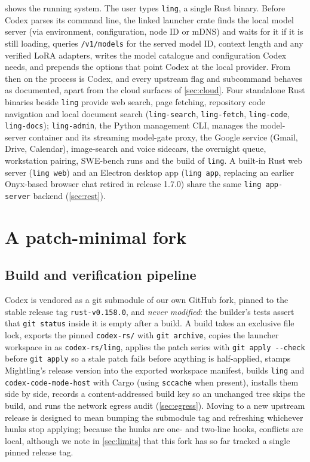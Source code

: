 \documentclass[11pt]{article}
\newcommand{\code}[1]{\texttt{#1}}
\begin{document}
 shows the running system. The user types \code{ling}, a single Rust binary.
Before Codex parses its command line, the linked launcher crate finds the local model server (via
environment, configuration, node ID or mDNS) and waits for it if it is still loading, queries
\code{/v1/models} for the served model ID, context length and any verified LoRA adapters, writes
the model catalogue and configuration Codex needs, and prepends the options that point Codex at the
local provider. From then on the process is Codex, and every upstream flag and subcommand behaves
as documented, apart from the cloud surfaces of \cref{sec:cloud}. Four standalone Rust binaries
beside \code{ling} provide web search, page fetching, repository code navigation and local document
search (\code{ling-search}, \code{ling-fetch}, \code{ling-code}, \code{ling-docs});
\code{ling-admin}, the Python management CLI, manages the model-server container and its streaming
model-gate proxy, the Google service (Gmail, Drive, Calendar), image-search and voice sidecars, the
overnight queue, workstation pairing, SWE-bench runs and the build of \code{ling}. A built-in Rust
web server (\code{ling web}) and an Electron desktop app (\code{ling app}, replacing an earlier
Onyx-based browser chat \cite{onyx} retired in release 1.7.0) share the same \code{ling app-server}
backend (\cref{sec:rest}).

\section{A patch-minimal fork}
\label{sec:fork}

\subsection{Build and verification pipeline}

Codex is vendored as a git submodule of our own GitHub fork, pinned to the stable release tag
\code{rust-v0.158.0}, and \emph{never modified}: the builder's tests assert that \code{git status}
inside it is empty after a build. A build takes an exclusive file lock, exports the pinned
\code{codex-rs/} with \code{git archive}, copies the launcher workspace in as \code{codex-rs/ling},
applies the patch series with \code{git apply -{}-check} before \code{git apply} so a stale patch
fails before anything is half-applied, stamps Mightling's release version into the exported
workspace manifest, builds \code{ling} and \code{codex-code-mode-host} with Cargo (using
\code{sccache} when present), installs them side by side, records a content-addressed build key so
an unchanged tree skips the build, and runs the network egress audit (\cref{sec:egress}). Moving to
a new upstream release is designed to mean bumping the submodule tag and refreshing whichever hunks
stop applying; because the hunks are one- and two-line hooks, conflicts are local, although we note
in \cref{sec:limits} that this fork has so far tracked a single pinned release tag.
\end{document}
